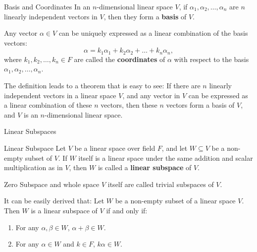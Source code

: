 \documentclass[11pt]{../../TexTemplate/elegantbook} %
\begin{document}
\begin{definition}{Basis and Coordinates}
    In an \( n \)-dimensional linear space \( V \), 
    if \( \alpha_1, \alpha_2, \dots, \alpha_n \) are \( n \) linearly independent vectors in \( V \),
    then they form a \textbf{basis} of \( V \).

    Any vector \( \alpha \in V \) can be uniquely expressed as a linear combination of the basis vectors:
    \[
    \alpha = k_1\alpha_1 + k_2\alpha_2 + \dots + k_n\alpha_n,
    \]
    where \( k_1, k_2, \dots, k_n \in F \) are called the \textbf{coordinates} of \( \alpha \) with respect to the basis 
    \( \alpha_1, \alpha_2, \dots, \alpha_n \).
\end{definition}

The definition leads to a theorem that is easy to see:
If there are \( n \) linearly independent vectors in a linear space \( V \),
and any vector in \( V \) can be expressed as a linear combination of these \( n \) vectors,
then these \( n \) vectors form a basis of \( V \), and \( V \) is an \( n \)-dimensional linear space.


\begin{leftbarTitle}{Linear Subspaces}\end{leftbarTitle}
\begin{definition}{Linear Subspace}
    Let \( V \) be a linear space over field \( F \), 
    and let \( W \subseteq V \) be a non-empty subset of \( V \).
    If \( W \) itself is a linear space under the same addition and scalar multiplication as in \( V \),
    then \( W \) is called a \textbf{linear subspace} of \( V \).
    
    Zero Subspace and whole space \( V \) itself are called trivial subspaces of \( V \).
\end{definition}

It can be easily derived that:
Let \(W\) be a non-empty subset of a linear space \(V\).
Then \(W\) is a linear subspace of \(V\) if and only if:
\begin{enumerate}
    \item For any \( \alpha, \beta \in W \), \( \alpha + \beta \in W \).
    \item For any \( \alpha \in W \) and \( k \in F \), \( k\alpha \in W \).
\end{enumerate}
\end{document}

